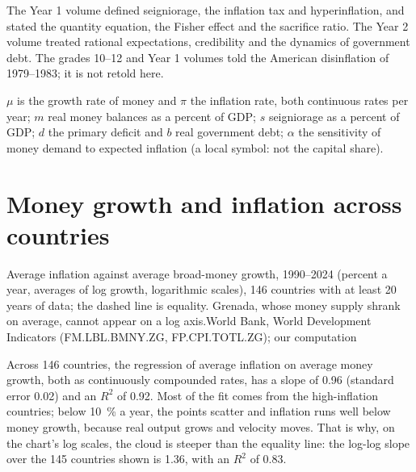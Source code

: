 \begin{recall}
The Year 1 volume defined seigniorage, the inflation tax and hyperinflation, and
stated the quantity equation, the Fisher effect and the sacrifice ratio. The Year 2
volume treated rational expectations, credibility and the dynamics of government
debt. The grades 10--12 and Year 1 volumes told the American disinflation of
1979--1983; it is not retold here.
\end{recall}

\begin{notation}\label{not:b3:inflation-evidence:symbols}
$\mu$ is the growth rate of money and $\pi$ the inflation rate, both continuous rates per
year; $m$ real money balances as a percent of GDP; $s$ seigniorage as a percent of
GDP; $d$ the primary deficit and $b$ real government debt; $\alpha$ the sensitivity of
money demand to expected inflation (a local symbol: not the capital share).
\end{notation}

\section{Money growth and inflation across countries}\label{sec:b3:inflation-evidence:quantity}

\begin{omchart}{Average inflation against average broad-money growth, 1990--2024
(percent a year, averages of log growth, logarithmic scales), 146 countries with
at least 20 years of data; the dashed line is equality. Grenada, whose money
supply shrank on average, cannot appear on a log axis.}{World Bank, World
Development Indicators (FM.LBL.BMNY.ZG, FP.CPI.TOTL.ZG); our computation}
\end{omchart}

Across 146 countries, the regression of average inflation on average money growth,
both as continuously compounded rates, has a slope of 0.96 (standard error 0.02) and
an $R^2$ of 0.92. Most of the fit comes from the high-inflation countries; below 10~\%
a year, the points scatter and inflation runs well below money growth, because real
output grows and velocity moves. That is why, on the chart's log scales, the cloud
is steeper than the equality line: the log-log slope over the 145 countries shown is
1.36, with an $R^2$ of 0.83.

